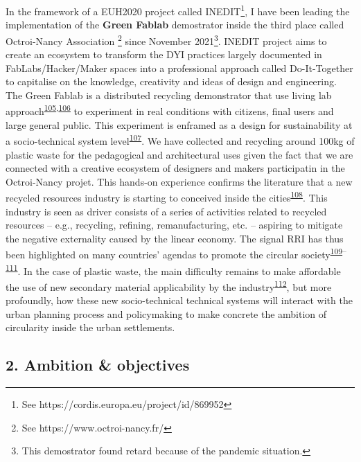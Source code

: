\documentclass[
  12pt,
  a4paperpaper,
  onecolumn]{article}
\begin{document}
In the framework of a EUH2020 project called INEDIT\footnote{See
  https://cordis.europa.eu/project/id/869952}, I have been leading the
implementation of the \textbf{Green Fablab} demostrator inside the third
place called Octroi-Nancy Association \footnote{See
  https://www.octroi-nancy.fr/} since November 2021\footnote{This
  demostrator found retard because of the pandemic situation.}. INEDIT
project aims to create an ecosystem to transform the DYI practices
largely documented in FabLabs/Hacker/Maker spaces into a professional
approach called Do-It-Together to capitalise on the knowledge,
creativity and ideas of design and engineering. The Green Fablab is a
distributed recycling demonstrator that use living lab
approach\textsuperscript{\protect\hyperlink{ref-tyl2021}{105},\protect\hyperlink{ref-compagnucci2020a}{106}}
to experiment in real conditions with citizens, final users and large
general public. This experiment is enframed as a design for
sustainability at a socio-technical system
level\textsuperscript{\protect\hyperlink{ref-Ceschin2016}{107}}. We have
collected and recycling around 100kg of plastic waste for the
pedagogical and architectural uses given the fact that we are connected
with a creative ecosystem of designers and makers participatin in the
Octroi-Nancy projet. This hands-on experience confirms the literature
that a new recycled resources industry is starting to conceived inside
the cities\textsuperscript{\protect\hyperlink{ref-wang2019b}{108}}. This
industry is seen as driver consists of a series of activities related to
recycled resources -- e.g., recycling, refining, remanufacturing, etc.
-- aspiring to mitigate the negative externality caused by the linear
economy. The signal RRI has thus been highlighted on many countries'
agendas to promote the circular
society\textsuperscript{\protect\hyperlink{ref-leipold2021}{109}--\protect\hyperlink{ref-jaeger-erben2021a}{111}}.
In the case of plastic waste, the main difficulty remains to make
affordable the use of new secondary material applicability by the
industry\textsuperscript{\protect\hyperlink{ref-klotz2022}{112}}, but
more profoundly, how these new socio-technical technical systems will
interact with the urban planning process and policymaking to make
concrete the ambition of circularity inside the urban settlements.

\hypertarget{ambition-objectives}{%
\subsection{2. Ambition \& objectives}\label{ambition-objectives}}
\end{document}
